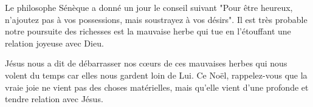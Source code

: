 Le philosophe Sénèque a donné un jour le conseil suivant "Pour être heureux, n'ajoutez pas à vos possessions, mais soustrayez à vos désirs". Il est très probable notre poursuite des richesses est la mauvaise herbe qui tue en l'étouffant une relation joyeuse avec Dieu.

Jésus nous a dit de débarrasser nos cœurs de ces mauvaises herbes qui nous volent du temps car elles nous gardent loin de Lui. Ce Noël, rappelez-vous que la vraie joie ne vient pas des choses matérielles, mais qu'elle vient d'une profonde et tendre relation avec Jésus.




